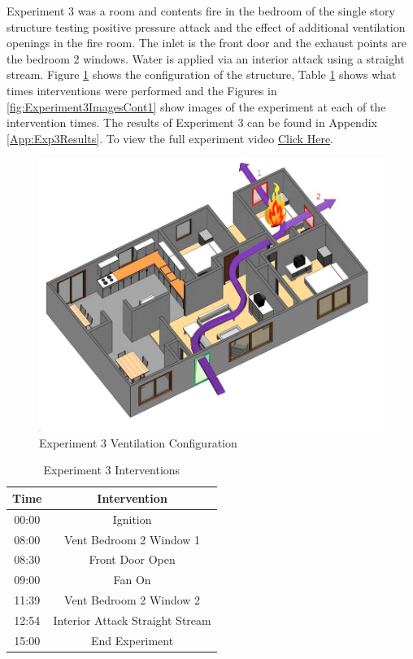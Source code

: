 \documentclass{article}
\begin{document}
Experiment 3 was a room and contents fire in the bedroom of the single story structure testing positive pressure attack and the effect of additional ventilation openings in the fire room. The inlet is the front door and the exhaust points are the bedroom 2 windows. Water is applied via an interior attack using a straight stream. Figure \ref{fig:Exp3VentConfig} shows the configuration of the structure, Table \ref{Table:Exp3Interventions} shows what times interventions were performed and the Figures in \ref{fig:Experiment3ImagesCont1} show images of the experiment at each of the intervention times. The results of Experiment 3 can be found in Appendix \ref{App:Exp3Results}. To view the full experiment video \href{https://youtu.be/fi9lZvUhMwE}{Click Here}.

\begin{figure}[H]
	\centering
	\includegraphics[width=5in]{0_Images/FireExperiments/Single_Story/Experiment_3.jpg}
	\caption{Experiment 3 Ventilation Configuration}
	\label{fig:Exp3VentConfig}
\end{figure}

\begin{table}[H]
	\centering
	\caption{Experiment 3 Interventions}
	\begin{tabular}{|c|c|} 
		\hline
		Time & Intervention \\ \hline \hline
		00:00 & Ignition \\ \hline
		08:00 & Vent Bedroom 2 Window 1 \\ \hline
		08:30 & Front Door Open \\ \hline
		09:00 & Fan On \\ \hline
		11:39 & Vent Bedroom 2 Window 2 \\ \hline
		12:54 & Interior Attack Straight Stream \\ \hline
		15:00 & End Experiment \\ \hline
	\end{tabular}
	\label{Table:Exp3Interventions}
\end{table}
\end{document}
